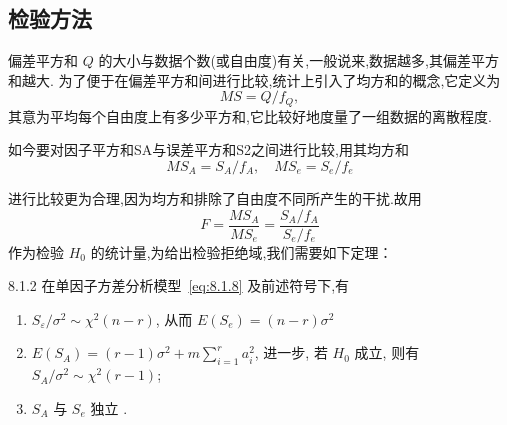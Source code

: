 \subsection{检验方法}

偏差平方和 $Q$ 的大小与数据个数(或自由度)有关,一般说来,数据越多,其偏差平方和越大. 为了便于在偏差平方和间进行比较,统计上引入了均方和的概念,它定义为
\begin{equation*}
  MS=Q/f_Q,
\end{equation*}
其意为平均每个自由度上有多少平方和,它比较好地度量了一组数据的离散程度.

如今要对因子平方和SA与误差平方和S2之间进行比较,用其均方和
\begin{equation*}
  MS_{A}=S_A / f_A, \quad MS_{e}=S_{e}/f_{e}
\end{equation*}


进行比较更为合理,因为均方和排除了自由度不同所产生的干扰.故用
\begin{equation}\label{eq:8.1.17}
  F = \frac{MS_{A}}{MS_{e}} = \frac{S_A/f_A}{S_e/f_e}
\end{equation}
作为检验 $H_0$ 的统计量,为给出检验拒绝域,我们需要如下定理：

\begin{theorem}{}{8.1.2}
  在单因子方差分析模型~\eqref{eq:8.1.8} 及前述符号下,有
  \begin{enumerate}
    \item $S_{\varepsilon} / \sigma^{2} \sim \chi^{2}(n-r)$, 从而 $E(S_{e})=(n-r) \sigma^{2}$ \label{enum:8.1.2.1}
    \item $E(S_{A})=(r-1) \sigma^{2} + m \sum_{i=1}^{r} a_{i}^{2}$, 进一步, 若 $H_0$ 成立, 则有 $S_{A} / \sigma^{2} \sim \chi^{2}(r-1)$;\label{enum:8.1.2.2}
    \item $S_A$ 与 $S_e$ 独立 \label{enum:8.1.2.3}.
  \end{enumerate}
\end{theorem}

